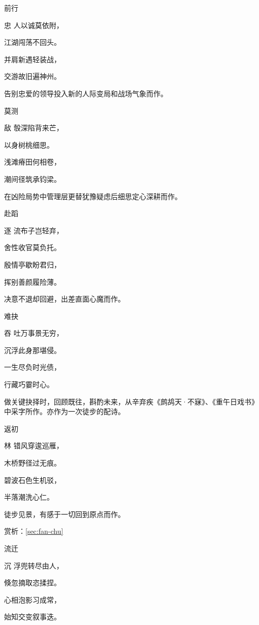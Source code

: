 \documentclass{article}
\newenvironment{poem}[3]{
\begin{minipage}{\textwidth}
\begin{pinyinscope}\begin{center}\Large\linespread{1.4}\selectfont #2\end{center}\end{pinyinscope}
\begin{pinyinscope}
	\begin{center}
	\Large\linespread{1.4}\rmfamily\selectfont #3
}{\end{center}
\end{pinyinscope}
\end{minipage}
}
\begin{document}
\begin{poem}{}{前行}
忠人以诚莫依附，

江湖闯荡不回头。

并肩新遇轻装战，

交游故旧遍神州。
\end{poem}

告别忠爱的领导投入新的人际变局和战场气象而作。

\begin{poem}{}{莫测}
敌彀深陷背来芒，

以身树桃细思{}。

浅滩瘠田何相卷，

潮间径筑承钧梁。
\end{poem}

在凶险局势中管理层更替犹豫疑虑后细思定心深耕而作。

\begin{poem}{}{赴蹈}
逐流布子岂轻弃，

舍性收官莫负托。

殷情亭歇盼君归，

挥别善颜履险薄。
\end{poem}

决意不退却回避，出差直面心魔而作。

\begin{poem}{}{难抉}
吞吐万事景无穷，

沉浮此身那堪侵。

一生尽负时光债，

行藏巧{}霎时心。
\end{poem}

做关键抉择时，回顾既往，斟酌未来，从辛弃疾《鹧鸪天·不寐》、《重午日戏书》中采字所作。亦作为一次徒步的配诗。

\begin{poem}{}{返初}
林错风穿逡巡雁，

木桥野径过无痕。

碧波石色生机驳，

半{}落潮洗心仁。
\end{poem}

徒步见景，有感于一切回到原点而作。

赏析：\ref{sec:fan-chu}

\begin{poem}{}{流迁}
沉浮兜转尽由人，

倏忽摘取恣揉捏。

心相泡影习成常，

始知交变叙事迭。
\end{poem}
\end{document}
